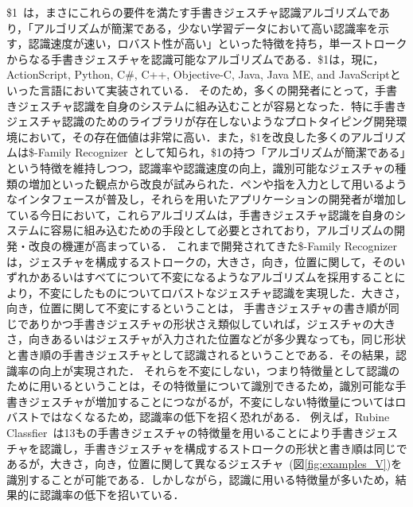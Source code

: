 \$1~\cite{Wobbrock:2007:GWL:1294211.1294238}は，まさにこれらの要件を満たす手書きジェスチャ認識アルゴリズムであり，「アルゴリズムが簡潔である，少ない学習データにおいて高い認識率を示す，認識速度が速い，ロバスト性が高い」といった特徴を持ち，単一ストロークからなる手書きジェスチャを認識可能なアルゴリズムである．\$1は，現に，ActionScript, Python, C\#, C++, Objective-C, Java, Java ME, and JavaScriptといった言語において実装されている．
そのため，多くの開発者にとって，手書きジェスチャ認識を自身のシステムに組み込むことが容易となった．特に手書きジェスチャ認識のためのライブラリが存在しないようなプロトタイピング開発環境において，その存在価値は非常に高い．また，\$1を改良した多くのアルゴリズムは\$-Family Recognizer~\cite{Anthony:2010:LMR:1839214.1839258,Reaver:2011:MQU:2021164.2021183,Li:2010:PFA:1753326.1753654,Anthony:2012:NFA:2305276.2305296,Herold:2012:CRF:2331067.2331074,Vatavu:2012:GPC:2388676.2388732,Taranta:2015:PPB:2788890.2788925,Pittman:2016:FFA:2856767.2856808,Vatavu:2012:OAF:2166966.2167022}として知られ，\$1の持つ「アルゴリズムが簡潔である」という特徴を維持しつつ，認識率や認識速度の向上，識別可能なジェスチャの種類の増加といった観点から改良が試みられた．ペンや指を入力として用いるようなインタフェースが普及し，それらを用いたアプリケーションの開発者が増加している今日において，これらアルゴリズムは，手書きジェスチャ認識を自身のシステムに容易に組み込むための手段として必要とされており，アルゴリズムの開発・改良の機運が高まっている．
これまで開発されてきた\$-Family Recognizerは，ジェスチャを構成するストロークの，大きさ，向き，位置に関して，そのいずれかあるいはすべてについて不変になるようなアルゴリズムを採用することにより，不変にしたものについてロバストなジェスチャ認識を実現した．大きさ，向き，位置に関して不変にするということは，
手書きジェスチャの書き順が同じでありかつ手書きジェスチャの形状さえ類似していれば，ジェスチャの大きさ，向きあるいはジェスチャが入力された位置などが多少異なっても，同じ形状と書き順の手書きジェスチャとして認識されるということである．その結果，認識率の向上が実現された．
それらを不変にしない，つまり特徴量として認識のために用いるということは，その特徴量について識別できるため，識別可能な手書きジェスチャが増加することにつながるが，不変にしない特徴量についてはロバストではなくなるため，認識率の低下を招く恐れがある．
例えば，Rubine Classfier~\cite{Rubine:1991:SGE:122718.122753}は13もの手書きジェスチャの特徴量を用いることにより手書きジェスチャを認識し，手書きジェスチャを構成するストロークの形状と書き順は同じであるが，大きさ，向き，位置に関して異なるジェスチャ~(図\ref{fig:examples_V})を識別することが可能である．しかしながら，認識に用いる特徴量が多いため，結果的に認識率の低下を招いている．

